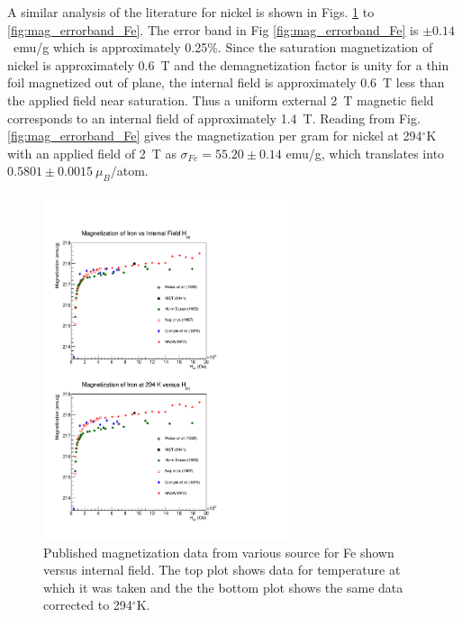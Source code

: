 \documentclass[12pt]{article}
\begin{document}
A similar analysis of the literature for nickel is shown in Figs. \ref{fig:mag_Fe} to \ref{fig:mag_errorband_Fe}. The error band in Fig \ref{fig:mag_errorband_Fe} is $\pm0.14$~emu/g which is approximately 0.25\%.  Since the saturation magnetization of nickel is approximately 0.6~T and the demagnetization factor is unity for a thin foil magnetized out of plane, the internal field is approximately 0.6~T less than the applied field near saturation. Thus a uniform external 2~T magnetic field corresponds to an internal field of approximately 1.4~T. Reading from Fig. \ref{fig:mag_errorband_Fe} gives the magnetization per gram for nickel at 294$^{\circ}$K with an applied field of 2~T as $\sigma_{Fe}=55.20\pm0.14$ emu/g, which translates into $0.5801\pm0.0015~\mu_B/$atom.
\begin{figure}
\centering
\includegraphics[width=0.64\textwidth]{FeMagnetization_vs_Hint.pdf}
\caption{Published magnetization data from various source for Fe shown versus internal field. The top plot shows data for temperature at which it was taken and the the bottom plot shows the same data corrected to 294$^{\circ}$K. }
\label{fig:mag_Fe}
\end{figure}
\end{document}
